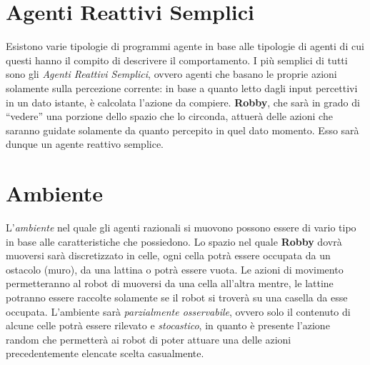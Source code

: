 \section{Agenti Reattivi Semplici}
Esistono varie tipologie di programmi agente in base alle tipologie di agenti
di cui questi hanno il compito di descrivere il comportamento. I più semplici di
tutti sono gli \textit{Agenti Reattivi Semplici}, ovvero agenti che basano le
proprie azioni solamente sulla percezione corrente: in base a quanto letto dagli
input percettivi in un dato istante, è calcolata l'azione da compiere.\newline
\textbf{Robby}, che sarà in grado di ``vedere'' una porzione dello spazio che lo
circonda, attuerà delle azioni che saranno guidate solamente da quanto percepito
in quel dato momento. Esso sarà dunque un agente reattivo semplice.

\section{Ambiente}
L'\textit{ambiente} nel quale gli agenti razionali si muovono possono essere di
vario tipo in base alle caratteristiche che possiedono.\newline
Lo spazio nel quale \textbf{Robby} dovrà muoversi sarà discretizzato in celle,
ogni cella potrà essere occupata da un ostacolo (muro), da una lattina o potrà
essere vuota. Le azioni di movimento permetteranno al robot di muoversi da una
cella all'altra mentre, le lattine potranno essere raccolte solamente se il
robot si troverà su una casella da esse occupata.\newline
L'ambiente sarà \textit{parzialmente osservabile}, ovvero solo il contenuto di
alcune celle potrà essere rilevato e \textit{stocastico}, in quanto è presente
l'azione random che permetterà ai robot di poter attuare una delle azioni
precedentemente elencate scelta casualmente.


